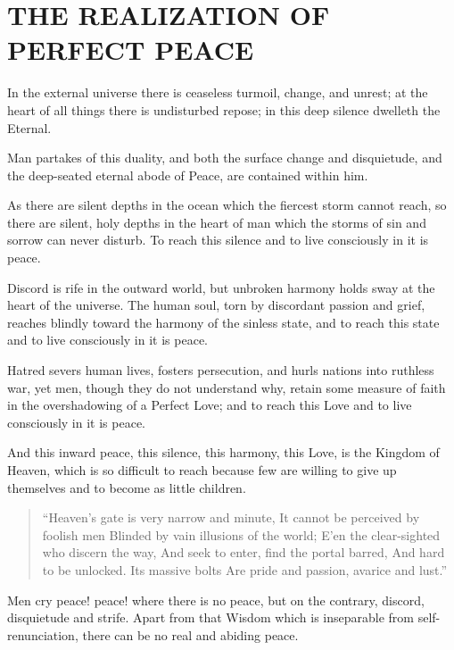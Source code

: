 \documentclass[12pt,oneside]{scrbook}
\begin{document}
  \section{THE REALIZATION OF PERFECT
  PEACE}\label{the-realization-of-perfect-peace}
  
  In the external universe there is ceaseless turmoil, change, and unrest;
  at the heart of all things there is undisturbed repose; in this deep
  silence dwelleth the Eternal.
  
  Man partakes of this duality, and both the surface change and
  disquietude, and the deep-seated eternal abode of Peace, are contained
  within him.
  
  As there are silent depths in the ocean which the fiercest storm cannot
  reach, so there are silent, holy depths in the heart of man which the
  storms of sin and sorrow can never disturb. To reach this silence and to
  live consciously in it is peace.
  
  Discord is rife in the outward world, but unbroken harmony holds sway at
  the heart of the universe. The human soul, torn by discordant passion
  and grief, reaches blindly toward the harmony of the sinless state, and
  to reach this state and to live consciously in it is peace.
  
  Hatred severs human lives, fosters persecution, and hurls nations into
  ruthless war, yet men, though they do not understand why, retain some
  measure of faith in the overshadowing of a Perfect Love; and to reach
  this Love and to live consciously in it is peace.
  
  And this inward peace, this silence, this harmony, this Love, is the
  Kingdom of Heaven, which is so difficult to reach because few are
  willing to give up themselves and to become as little children.
  
  \begin{quote}
  ``Heaven's gate is very narrow and minute, It cannot be perceived by
  foolish men Blinded by vain illusions of the world; E'en the
  clear-sighted who discern the way, And seek to enter, find the portal
  barred, And hard to be unlocked. Its massive bolts Are pride and
  passion, avarice and lust.''
  \end{quote}
  
  Men cry peace! peace! where there is no peace, but on the contrary,
  discord, disquietude and strife. Apart from that Wisdom which is
  inseparable from self-renunciation, there can be no real and abiding
  peace.
  
\end{document}
